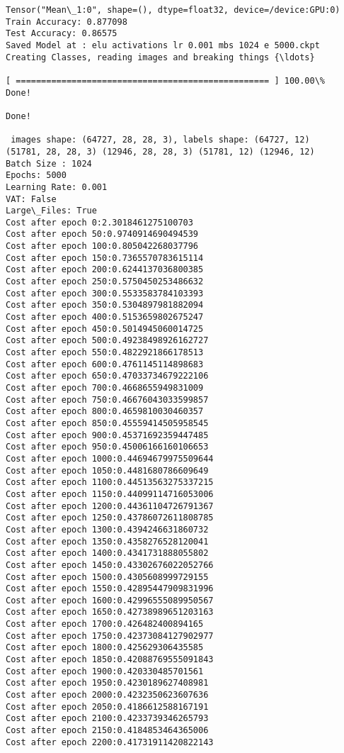 \documentclass[11pt]{article}
\begin{document}
    \begin{Verbatim}[commandchars=\\\{\}]
Tensor("Mean\_1:0", shape=(), dtype=float32, device=/device:GPU:0)
Train Accuracy: 0.877098
Test Accuracy: 0.86575
Saved Model at : elu activations lr 0.001 mbs 1024 e 5000.ckpt
Creating Classes, reading images and breaking things {\ldots}

[ ================================================== ] 100.00\%
Done!

Done!

 images shape: (64727, 28, 28, 3), labels shape: (64727, 12)
(51781, 28, 28, 3) (12946, 28, 28, 3) (51781, 12) (12946, 12)
Batch Size : 1024
Epochs: 5000
Learning Rate: 0.001
VAT: False
Large\_Files: True 
Cost after epoch 0:2.3018461275100703
Cost after epoch 50:0.9740914690494539
Cost after epoch 100:0.805042268037796
Cost after epoch 150:0.7365570783615114
Cost after epoch 200:0.6244137036800385
Cost after epoch 250:0.5750450253486632
Cost after epoch 300:0.5533583784103393
Cost after epoch 350:0.5304897981882094
Cost after epoch 400:0.5153659802675247
Cost after epoch 450:0.5014945060014725
Cost after epoch 500:0.49238498926162727
Cost after epoch 550:0.4822921866178513
Cost after epoch 600:0.4761145114898683
Cost after epoch 650:0.47033734679222106
Cost after epoch 700:0.4668655949831009
Cost after epoch 750:0.46676043033599857
Cost after epoch 800:0.4659810030460357
Cost after epoch 850:0.45559414505958545
Cost after epoch 900:0.45371692359447485
Cost after epoch 950:0.45006166160106653
Cost after epoch 1000:0.44694679975509644
Cost after epoch 1050:0.4481680786609649
Cost after epoch 1100:0.44513563275337215
Cost after epoch 1150:0.44099114716053006
Cost after epoch 1200:0.44361104726791367
Cost after epoch 1250:0.43786072611808785
Cost after epoch 1300:0.4394246631860732
Cost after epoch 1350:0.4358276528120041
Cost after epoch 1400:0.4341731888055802
Cost after epoch 1450:0.43302676022052766
Cost after epoch 1500:0.4305608999729155
Cost after epoch 1550:0.42895447909831996
Cost after epoch 1600:0.42996555089950567
Cost after epoch 1650:0.42738989651203163
Cost after epoch 1700:0.426482400894165
Cost after epoch 1750:0.42373084127902977
Cost after epoch 1800:0.425629306435585
Cost after epoch 1850:0.42088769555091843
Cost after epoch 1900:0.420330485701561
Cost after epoch 1950:0.4230189627408981
Cost after epoch 2000:0.4232350623607636
Cost after epoch 2050:0.4186612588167191
Cost after epoch 2100:0.4233739346265793
Cost after epoch 2150:0.4184853464365006
Cost after epoch 2200:0.41731911420822143

\end{Verbatim}
\end{document}
